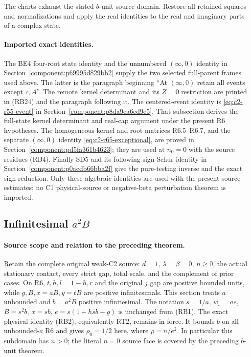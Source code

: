 The charts exhaust the stated $b$-unit source domain. Restore all retained
squares and normalizations and apply the real identities to the real and
imaginary parts of a complex state.

\paragraph{Imported exact identities.}
The BE4 four-root state identity and the unnumbered $(\infty,0)$
identity in Section~\ref{component:p69995d829bb2} supply the two
selected full-parent frames used above. The latter is the paragraph
beginning ``At $(\infty,0)$ retain all events except $c,A$''.
The remote kernel determinant and its $Z=0$ restriction are printed
in (RB24) and the paragraph following it. The centered-event identity
is \eqref{eq:c2-r55-event} in Section~\ref{component:p8da9ea6ed9e5}.
That subsection derives the full-state kernel determinant and real-cap
argument under the present R6 hypotheses. The homogeneous
kernel and root matrices R6.5--R6.7, and the separate
$(\infty,0)$ identity \eqref{eq:c2-r65-exceptional}, are proved in
Section~\ref{component:pd5fa361b4623}; they are used at $n_0=0$
with the source residues (RB4). Finally SD5 and its following sign
Schur identity in Section~\ref{component:p0acdb66bba2f} give the
pure-testing inverse and the exact sign reduction. Only these
algebraic identities are used with the present source estimates;
no C1 physical-source or negative-beta perturbation theorem is imported.

\subsection{Infinitesimal $a^2B$}
\label{component:p75b395956985}

\label{p75b395956985:sec:r6-b-inf}

\paragraph{Source scope and relation to the preceding theorem.}
Retain the complete original weak-C2 source: $d=1$, $\lambda=\beta=0$,
$n\geq0$, the actual stationary contact, every strict gap, total scale,
and the complement of prior cases. On R6, $t,h,l=1-h,r$ and
the original $j$ gap are positive bounded units, while $g,B,x=aB,y=tB$
are positive infinitesimals. This section treats $a$ unbounded and
$b=a^2B$ positive infinitesimal. The notation $s=1/a$, $w_s=ae$,
$B=s^2b$, $x=sb$, $e=s(1+hsb-g)$ is unchanged from (RB1).
The exact physical identity (RB2), equivalently RT2, remains in force.
It bounds $b$ on all unbounded-$a$ R6 and gives $\rho_0=1/2$ here,
where $\rho=n/e^2$. In particular this subdomain has $n>0$; the
literal $n=0$ source face is covered by the preceding $b$-unit theorem.

